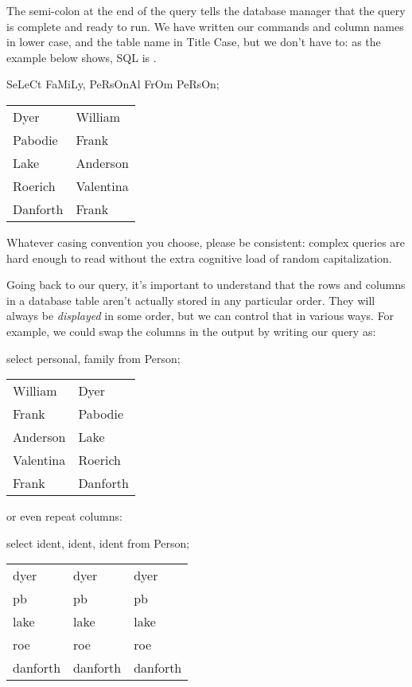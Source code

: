 \documentclass{book}
\begin{document}
The semi-colon at the end of the query tells the database manager that
the query is complete and ready to run. We have written our commands and
column names in lower case, and the table name in Title Case, but we
don't have to: as the example below shows, SQL is
.

\begin{VerbIn}
SeLeCt FaMiLy, PeRsOnAl FrOm PeRsOn;
\end{VerbIn}

\begin{tabular}{ll}
Dyer & William \\
Pabodie & Frank \\
Lake & Anderson \\
Roerich & Valentina \\
Danforth & Frank \\
\end{tabular}

Whatever casing convention you choose, please be consistent: complex
queries are hard enough to read without the extra cognitive load of
random capitalization.

Going back to our query, it's important to understand that the rows and
columns in a database table aren't actually stored in any particular
order. They will always be \emph{displayed} in some order, but we can
control that in various ways. For example, we could swap the columns in
the output by writing our query as:

\begin{VerbIn}
select personal, family from Person;
\end{VerbIn}

\begin{tabular}{ll}
William & Dyer \\
Frank & Pabodie \\
Anderson & Lake \\
Valentina & Roerich \\
Frank & Danforth \\
\end{tabular}

or even repeat columns:

\begin{VerbIn}
select ident, ident, ident from Person;
\end{VerbIn}

\begin{tabular}{lll}
dyer & dyer & dyer \\
pb & pb & pb \\
lake & lake & lake \\
roe & roe & roe \\
danforth & danforth & danforth \\
\end{tabular}
\end{document}

